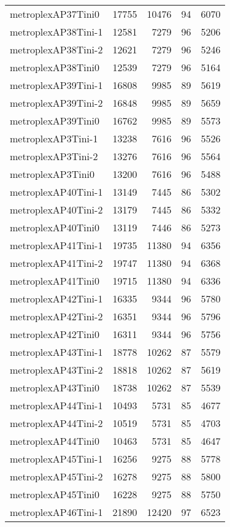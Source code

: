 \begin{longtable}{lrrrr}
metroplexAP37Tini0 & 17755 & 10476 & 94 & 6070 \\
metroplexAP38Tini-1 & 12581 & 7279 & 96 & 5206 \\
metroplexAP38Tini-2 & 12621 & 7279 & 96 & 5246 \\
metroplexAP38Tini0 & 12539 & 7279 & 96 & 5164 \\
metroplexAP39Tini-1 & 16808 & 9985 & 89 & 5619 \\
metroplexAP39Tini-2 & 16848 & 9985 & 89 & 5659 \\
metroplexAP39Tini0 & 16762 & 9985 & 89 & 5573 \\
metroplexAP3Tini-1 & 13238 & 7616 & 96 & 5526 \\
metroplexAP3Tini-2 & 13276 & 7616 & 96 & 5564 \\
metroplexAP3Tini0 & 13200 & 7616 & 96 & 5488 \\
metroplexAP40Tini-1 & 13149 & 7445 & 86 & 5302 \\
metroplexAP40Tini-2 & 13179 & 7445 & 86 & 5332 \\
metroplexAP40Tini0 & 13119 & 7446 & 86 & 5273 \\
metroplexAP41Tini-1 & 19735 & 11380 & 94 & 6356 \\
metroplexAP41Tini-2 & 19747 & 11380 & 94 & 6368 \\
metroplexAP41Tini0 & 19715 & 11380 & 94 & 6336 \\
metroplexAP42Tini-1 & 16335 & 9344 & 96 & 5780 \\
metroplexAP42Tini-2 & 16351 & 9344 & 96 & 5796 \\
metroplexAP42Tini0 & 16311 & 9344 & 96 & 5756 \\
metroplexAP43Tini-1 & 18778 & 10262 & 87 & 5579 \\
metroplexAP43Tini-2 & 18818 & 10262 & 87 & 5619 \\
metroplexAP43Tini0 & 18738 & 10262 & 87 & 5539 \\
metroplexAP44Tini-1 & 10493 & 5731 & 85 & 4677 \\
metroplexAP44Tini-2 & 10519 & 5731 & 85 & 4703 \\
metroplexAP44Tini0 & 10463 & 5731 & 85 & 4647 \\
metroplexAP45Tini-1 & 16256 & 9275 & 88 & 5778 \\
metroplexAP45Tini-2 & 16278 & 9275 & 88 & 5800 \\
metroplexAP45Tini0 & 16228 & 9275 & 88 & 5750 \\
metroplexAP46Tini-1 & 21890 & 12420 & 97 & 6523 \\

\end{longtable}
